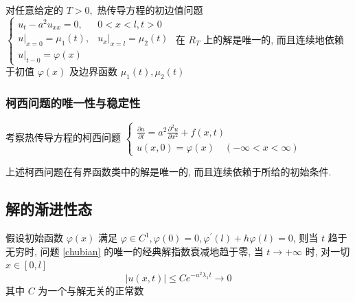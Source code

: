 \documentclass[10pt]{yerbaformat}
\begin{document}
\begin{theorem}
    对任意给定的 $T>0,$ 热传导方程的初边值问题 $\left\{\begin{array}{ll}u_{t}-a^{2} u_{x x}=0, & 0<x<l, t>0 \\ \left.u\right|_{x=0}=\mu_{1}(t), & \left.u_{x}\right|_{x=l}=\mu_{2}(t) \\ u|_{t-0}=\varphi(x)\end{array}\right.$ 在 $R_{T}$ 上的解是唯一的, 而且连续地依赖于初值 $\varphi(x)$ 及边界函数 $\mu_{1}(t), \mu_{2}(t)$
\end{theorem}

\subsubsection{柯西问题的唯一性与稳定性}

\par 考察热传导方程的柯西问题 $\left\{\begin{array}{l}\frac{\partial u}{\partial t}=a^{2} \frac{\partial^{2} u}{\partial x^{2}}+f(x, t) \\ u(x, 0)=\varphi(x) \quad(-\infty<x<\infty)\end{array}\right.$

\begin{theorem}
    上述柯西问题在有界函数类中的解是唯一的, 而且连续依赖于所给的初始条件.
\end{theorem}

\subsection{解的渐进性态}

\begin{theorem}[初边值问题解的渐进性态]
    假设初始函数 $\varphi(x)$ 满足 $\varphi \in C^{1}, \varphi(0)=0, \varphi^{\prime}(l)+h \varphi(l)=0$, 则当 $t$ 趋于无穷时, 问题 \ref{chubian} 的唯一的经典解指数衰减地趋于零, 当 $t \rightarrow+\infty$ 时, 对一切 $x \in[0, l]$ $$ |u(x, t)| \leqslant C e^{-u^{2} \lambda_{1} t} \rightarrow 0 $$ 其中 $C$ 为一个与解无关的正常数
\end{theorem}

\end{document}
